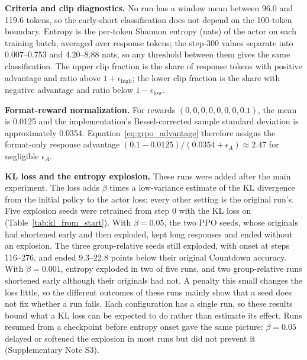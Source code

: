 \documentclass[ai,article,submit,oneauthor]{Definitions/mdpi}
\begin{document}
\noindent\textbf{Criteria and clip diagnostics.}
No run has a window mean between 96.0 and 119.6 tokens, so the early-short classification does not depend on the 100-token boundary. Entropy is the per-token Shannon entropy (nats) of the actor on each training batch, averaged over response tokens; the step-300 values separate into 0.007--0.753 and 4.20--8.88 nats, so any threshold between them gives the same classification. The upper clip fraction is the share of response tokens with positive advantage and ratio above $1+\epsilon_{\mathrm{high}}$; the lower clip fraction is the share with negative advantage and ratio below $1-\epsilon_{\mathrm{low}}$.

\noindent\textbf{Format-reward normalization.}
For rewards $(0,0,0,0,0,0,0,0.1)$, the mean is 0.0125 and the implementation's Bessel-corrected sample standard deviation is approximately 0.0354. Equation~\ref{eq:grpo_advantage} therefore assigns the format-only response advantage $(0.1-0.0125)/(0.0354+\epsilon_A)\approx2.47$ for negligible $\epsilon_A$.

\noindent\textbf{KL loss and the entropy explosion.}\label{app:kl_blowup}
These runs were added after the main experiment. The loss adds $\beta$ times a low-variance estimate of the KL divergence from the initial policy to the actor loss; every other setting is the original run's. Five explosion seeds were retrained from step 0 with the KL loss on (Table~\ref{tab:kl_from_start}). With $\beta=0.05$, the two PPO seeds, whose originals had shortened early and then exploded, kept long responses and ended without an explosion. The three group-relative seeds still exploded, with onset at steps 116--276, and ended 9.3--22.8 points below their original Countdown accuracy. With $\beta=0.001$, entropy exploded in two of five runs, and two group-relative runs shortened early although their originals had not. A penalty this small changes the loss little, so the different outcomes of these runs mainly show that a seed does not fix whether a run fails. Each configuration has a single run, so these results bound what a KL loss can be expected to do rather than estimate its effect. Runs resumed from a checkpoint before entropy onset gave the same picture: $\beta=0.05$ delayed or softened the explosion in most runs but did not prevent it (Supplementary Note S3).
\end{document}

